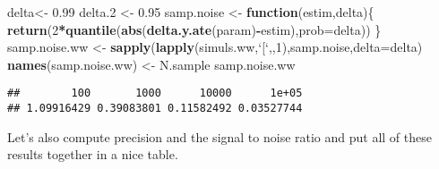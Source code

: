 \documentclass[]{book}
\newenvironment{Shaded}{\begin{snugshade}}{\end{snugshade}}
\newcommand{\ControlFlowTok}[1]{\textcolor[rgb]{0.13,0.29,0.53}{\textbf{#1}}}
\newcommand{\DataTypeTok}[1]{\textcolor[rgb]{0.13,0.29,0.53}{#1}}
\newcommand{\DecValTok}[1]{\textcolor[rgb]{0.00,0.00,0.81}{#1}}
\newcommand{\FloatTok}[1]{\textcolor[rgb]{0.00,0.00,0.81}{#1}}
\newcommand{\KeywordTok}[1]{\textcolor[rgb]{0.13,0.29,0.53}{\textbf{#1}}}
\newcommand{\NormalTok}[1]{#1}
\newcommand{\OperatorTok}[1]{\textcolor[rgb]{0.81,0.36,0.00}{\textbf{#1}}}
\newcommand{\StringTok}[1]{\textcolor[rgb]{0.31,0.60,0.02}{#1}}
\theoremstyle{definition}
\theoremstyle{definition}
\theoremstyle{definition}
\theoremstyle{remark}
\begin{document}
\begin{Shaded}
\begin{Highlighting}[]
\NormalTok{delta<-}\StringTok{ }\FloatTok{0.99}
\NormalTok{delta}\FloatTok{.2}\NormalTok{ <-}\StringTok{ }\FloatTok{0.95}
\NormalTok{samp.noise <-}\StringTok{ }\ControlFlowTok{function}\NormalTok{(estim,delta)\{}
  \KeywordTok{return}\NormalTok{(}\DecValTok{2}\OperatorTok{*}\KeywordTok{quantile}\NormalTok{(}\KeywordTok{abs}\NormalTok{(}\KeywordTok{delta.y.ate}\NormalTok{(param)}\OperatorTok{-}\NormalTok{estim),}\DataTypeTok{prob=}\NormalTok{delta))}
\NormalTok{\}}
\NormalTok{samp.noise.ww <-}\StringTok{ }\KeywordTok{sapply}\NormalTok{(}\KeywordTok{lapply}\NormalTok{(simuls.ww,}\StringTok{`}\DataTypeTok{[}\StringTok{`}\NormalTok{,,}\DecValTok{1}\NormalTok{),samp.noise,}\DataTypeTok{delta=}\NormalTok{delta)}
\KeywordTok{names}\NormalTok{(samp.noise.ww) <-}\StringTok{ }\NormalTok{N.sample}
\NormalTok{samp.noise.ww}
\end{Highlighting}
\end{Shaded}

\begin{verbatim}
##        100       1000      10000      1e+05 
## 1.09916429 0.39083801 0.11582492 0.03527744
\end{verbatim}

Let's also compute precision and the signal to noise ratio and put all of these results together in a nice table.
\end{document}

